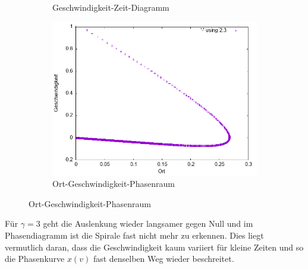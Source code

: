 \documentclass[
    oneside,
    ngerman,
    footinclude=false,
    captions=tableheading,
    DIV=12
]{scrartcl}
\begin{document}
\begin{figure}[H]
\begin{subfigure}[b]{0.45\textwidth}
                        \caption{Geschwindigkeit-Zeit-Diagramm}
                        \label{fig:VVA1(a)-001-3-v}
                    \end{subfigure}
                    \begin{subfigure}[b]{0.45\textwidth}
                        \centering
                        \includegraphics[width=\textwidth]{Bilddateien/VVA1(b)-001-3-xv.png}
                        \caption{Ort-Geschwindigkeit-Phasenraum}
                        \label{fig:VVA1(a)-001-3-xv}
                    \end{subfigure}
                \end{figure}
               Für $\gamma=3$ geht die Auslenkung wieder langsamer gegen Null und im Phasendiagramm ist die Spirale fast nicht mehr zu erkennen. Dies liegt vermutlich daran, dass die Geschwindigkeit kaum variiert für kleine Zeiten und so die Phasenkurve $x(v)$ fast denselben Weg wieder beschreitet.
\end{document}
